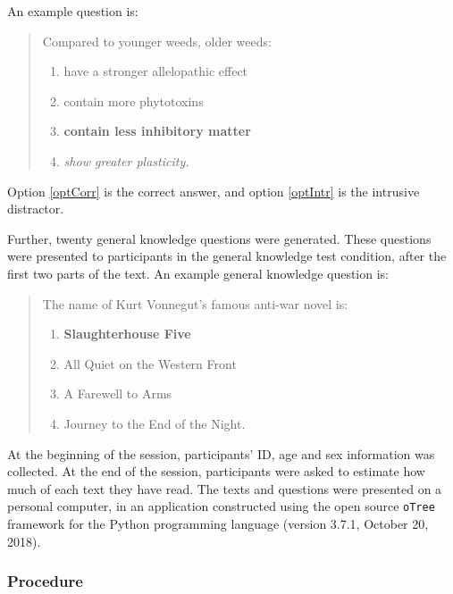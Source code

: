 \documentclass[12pt,]{article}
\begin{document}
\vspace{\parskip}

An example question is:

\begin{quotation}
\noindent Compared to younger weeds, older weeds:
\begin{enumerate}[label = (\alph*)]
\item have a stronger allelopathic effect
\item contain more phytotoxins
\item \label{optCorr} \textbf{contain less inhibitory matter}
\item \label{optIntr} \textit{show greater plasticity.}
\end{enumerate}
\end{quotation}

Option \ref{optCorr} is the correct answer, and option \ref{optIntr} is
the intrusive distractor.

Further, twenty general knowledge questions were generated. These
questions were presented to participants in the general knowledge test
condition, after the first two parts of the text. An example general
knowledge question is:

\begin{quotation}
\noindent The name of Kurt Vonnegut's famous anti-war novel is:
\begin{enumerate}[label = (\alph*)]
\item \textbf{Slaughterhouse Five}
\item All Quiet on the Western Front
\item A Farewell to Arms
\item Journey to the End of the Night.
\end{enumerate}
\end{quotation}

At the beginning of the session, participants' ID, age and sex
information was collected. At the end of the session, participants were
asked to estimate how much of each text they have read. The texts and
questions were presented on a personal computer, in an application
constructed using the open source \texttt{oTree} framework
\citep[version 2.0,][]{chen_otreeopen-source_2016} for the Python
programming language (version 3.7.1, October 20, 2018).

\hypertarget{procedure}{%
\subsubsection{Procedure}\label{procedure}}
\end{document}
